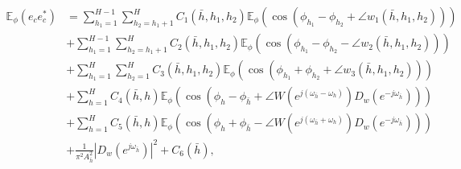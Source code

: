 \begin{equation}\label{phasevar0}
	\begin{split}
		\mathbb{E}_\phi\left(e_c e_c^*\right)&=\!\sum_{h_1=1}^{H-1} \sum_{h_2=h_1+1}^H \! C_1(\bar{h},h_1,h_2) \mathbb{E}_\phi\!\left(\cos(\phi_{h_1} \!-\! \phi_{h_2} \!+\!\angle w_1(\bar{h},h_1,h_2))\right)\\
		&+ \!\sum_{h_1=1}^{H-1} \sum_{h_2=h_1+1}^H\!C_2(\bar{h},h_1,h_2)\mathbb{E}_\phi\!\left(\cos(\phi_{h_1} \!-\! \phi_{h_2} \!-\!\angle w_2(\bar{h},h_1,h_2))\right)\\
		&+ \!\sum_{h_1=1}^H \sum_{h_2=1}^H\!C_3(\bar{h},h_1,h_2)\mathbb{E}_\phi\!\left(\cos(\phi_{h_1} \!+\! \phi_{h_2} \!+\!\angle w_3(\bar{h},h_1,h_2))\right)\\
		&+\sum_{h=1}^H C_4(\bar{h},h)\mathbb{E}_\phi\left(\cos(\phi_h-\phi_{\bar{h}}+\angle W(e^{j(\omega_{\bar{h}}-\omega_h)})D_w(e^{-j\omega_{\bar{h}}}))\right)\\
		&+\sum_{h=1}^H C_5(\bar{h},h)\mathbb{E}_\phi\left(\cos(\phi_h+\phi_{\bar{h}}-\angle W(e^{j(\omega_{\bar{h}}+\omega_h)})D_w(e^{-j\omega_{\bar{h}}}))\right)\\
		&+\frac{1}{\pi^2A_{\bar{h}}^2}|D_w(e^{j\omega_{\bar{h}}})|^2 + C_6(\bar{h}),
	\end{split}
\end{equation}
